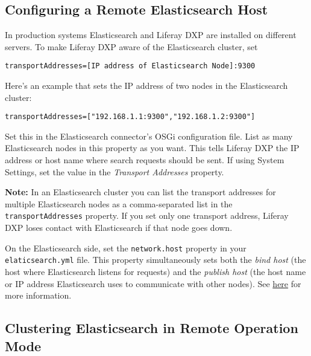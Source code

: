 \subsection{Configuring a Remote Elasticsearch
Host}\label{configuring-a-remote-elasticsearch-host-1}

In production systems Elasticsearch and Liferay DXP are installed on
different servers. To make Liferay DXP aware of the Elasticsearch
cluster, set

\begin{verbatim}
transportAddresses=[IP address of Elasticsearch Node]:9300
\end{verbatim}

Here's an example that sets the IP address of two nodes in the
Elasticsearch cluster:

\begin{verbatim}
transportAddresses=["192.168.1.1:9300","192.168.1.2:9300"]
\end{verbatim}

Set this in the Elasticsearch connector's OSGi configuration file. List
as many Elasticsearch nodes in this property as you want. This tells
Liferay DXP the IP address or host name where search requests should be
sent. If using System Settings, set the value in the \emph{Transport
Addresses} property.

\noindent\hrulefill

\textbf{Note:} In an Elasticsearch cluster you can list the transport
addresses for multiple Elasticsearch nodes as a comma-separated list in
the \texttt{transportAddresses} property. If you set only one transport
address, Liferay DXP loses contact with Elasticsearch if that node goes
down.

\noindent\hrulefill

On the Elasticsearch side, set the \texttt{network.host} property in
your \texttt{elaticsearch.yml} file. This property simultaneously sets
both the \emph{bind host} (the host where Elasticsearch listens for
requests) and the \emph{publish host} (the host name or IP address
Elasticsearch uses to communicate with other nodes). See
\href{https://www.elastic.co/guide/en/elasticsearch/reference/6.1/modules-network.html}{here}
for more information.

\subsection{Clustering Elasticsearch in Remote Operation
Mode}\label{clustering-elasticsearch-in-remote-operation-mode-1}

